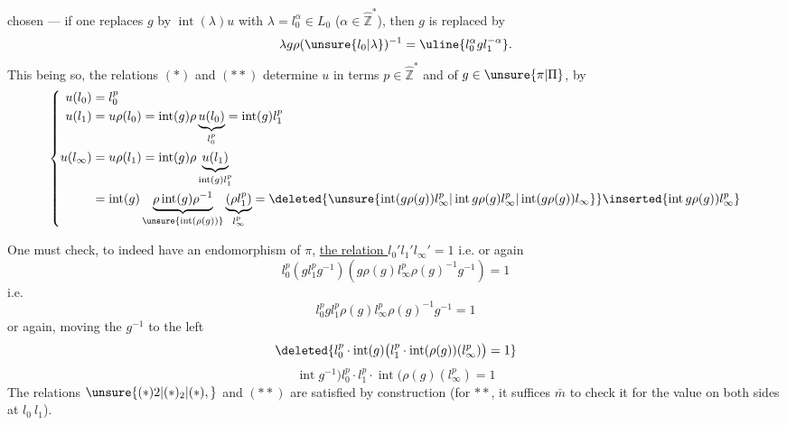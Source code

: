 chosen --- if one  replaces $g$ by $\operatorname{int}(\lambda)u$ with $\lambda=l_0^\alpha\in L_0$ ($\alpha\in\hat{\mathbb Z}^{*}$), then $g$ is replaced by
\[
\lambda g\rho(\unsure{l_0|\lambda})^{-1}=\uline{l_0^\alpha gl_1^{-\alpha}}.
\]
This being so,  the relations $(*)$ and $(**)$ determine $u$ in terms $p\in\hat{\mathbb Z}^{*}$ and of $g\in\unsure{\pi|\Pi}$, by
\[
\left\{\begin{aligned}
u(l_0)&=l_0^p\\
u(l_1)&=u\rho(l_0)=\operatorname{int}(g)\rho\underbrace{u(l_0)}_{l_0^p}=\operatorname{int}(g)l_1^p\\
u(l_\infty)&=u\rho(l_1)=\operatorname{int}(g)\rho\underbrace{u(l_1)}_{\operatorname{int}(g)l_1^p}\\
&=\operatorname{int}(g)\underbrace{\rho\operatorname{int}(g)\rho^{-1}}_{\unsure{\operatorname{int}(\rho(g))}}\underbrace{(\rho l_1^p)}_{l_\infty^p}
=\deleted{\unsure{\operatorname{int}(g\rho(g))l_\infty^p|\operatorname{int}g\rho(g)l_\infty^p|\operatorname{int}(g\rho(g))l_\infty}}\inserted{\operatorname{int}g\rho(g))l_\infty^p}
\end{aligned}\right.
\]

One must check, to indeed have an endomorphism of $\pi$, \uline{the relation $l_0'l_1'l_\infty'=1$} i.e.
or again
\[
l_0^p(gl_1^pg^{-1})(g\rho(g)l_\infty^p\rho(g)^{-1}g^{-1})=1
\]
i.e.
\[
l_0^pgl_1^p\rho(g)l_\infty^p\rho(g)^{-1}g^{-1}=1
\]
or again, moving the $g^{-1}$ to the left
\[
\deleted{l_0^p\cdot\operatorname{int}(g)\bigl(l_1^p\cdot\operatorname{int}(\rho(g))(l_\infty^p)\bigr)=1}
\]
\[
\operatorname{int}g^{-1})l_0^p\cdot l_1^p\cdot\operatorname{int}(\rho(g)(l_\infty^p)=1
\]
The relations $\unsure{(*)2|(*)_2|(*),}$ and $(**)$ are satisfied by construction (for $**$, it suffices $\bar m$ to check it for the value on both sides at $l_0\ l_1$).
